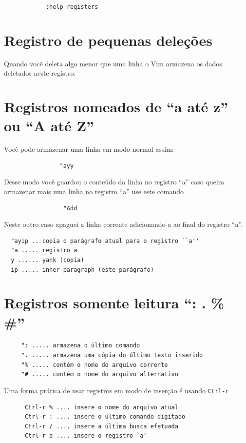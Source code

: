 \documentclass[10pt,a4paper,openany]{book}
\begin{document}
\begin{verbatim}
			:help registers
\end{verbatim}

\section{Registro de pequenas deleções}
\label{Registro de pequenas deleções}
Quando você deleta algo menor que uma linha o Vim armazena os dados deletados neste registro.

\section{Registros nomeados de ``a até z'' ou ``A até Z''}
\label{Registros nomeados de ``a até z'' ou ``A até Z''}
Você pode armazenar uma linha em modo normal assim:

\begin{verbatim}
				"ayy
\end{verbatim}

Desse modo você guardou o conteúdo da linha no registro ``a'' caso
queira armazenar mais uma linha no registro ``a'' use este comando

\begin{verbatim}
				 "Add
\end{verbatim}

Neste outro caso apaguei a linha corrente adicionando-a ao final do registro ``a''.

\begin{verbatim}
  "ayip .. copia o parágrafo atual para o registro ``a''
  "a ..... registro a
  y ...... yank (copia)
  ip ..... inner paragraph (este parágrafo)
\end{verbatim}

\section{Registros somente leitura ``: . \% \#''}
\label{Registros somente leitura}

\begin{verbatim}
	 ": ..... armazena o último comando
	 ". ..... armazena uma cópia do último texto inserido
	 "% ..... contém o nome do arquivo corrente
	 "# ..... contém o nome do arquivo alternativo
\end{verbatim}

Uma forma prática de usar registros em modo de inserção é usando
\verb|Ctrl-r|


\begin{verbatim}
	  Ctrl-r % .... insere o nome do arquivo atual
	  Ctrl-r : .... insere o último comando digitado
	  Ctrl-r / .... insere a última busca efetuada
	  Ctrl-r a .... insere o registro `a'
\end{verbatim}
\end{document}
